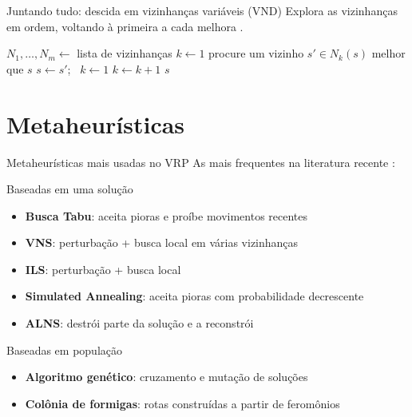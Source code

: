 \documentclass[aspectratio=169,xcolor=table]{beamer}
\begin{document}
\begin{frame}{Juntando tudo: descida em vizinhanças variáveis (VND)}
  Explora as vizinhanças em ordem, voltando à primeira a cada melhora \cite{mladenovic1997variable}.
  \vspace{0.5em}
  \begin{algorithmic}[1]
    \State $N_1, \dots, N_m \gets$ lista de vizinhanças
    \State $k \gets 1$
      \State procure um vizinho $s' \in N_k(s)$ melhor que $s$
        \State $s \gets s'$; \ $k \gets 1$
      \Else
        \State $k \gets k + 1$
      \EndIf
    \EndWhile
    \State \Return $s$ 
  \end{algorithmic}
\end{frame}

\section{Metaheurísticas}

\begin{frame}{Metaheurísticas mais usadas no VRP}
  As mais frequentes na literatura recente \cite{elshaer2020taxonomic,endler2023systematic}:
  \small
  \begin{block}{Baseadas em uma solução}
    \begin{itemize}
      \item \textbf{Busca Tabu}: aceita pioras e proíbe movimentos recentes \cite{glover1986future}
      \item \textbf{VNS}: perturbação + busca local em várias vizinhanças \cite{mladenovic1997variable}
      \item \textbf{ILS}: perturbação + busca local \cite{lourenco2003iterated}
      \item \textbf{Simulated Annealing}: aceita pioras com probabilidade decrescente \cite{kirkpatrick1983optimization}
      \item \textbf{ALNS}: destrói parte da solução e a reconstrói \cite{ropke2006alns}
    \end{itemize}
  \end{block}
  \begin{block}{Baseadas em população}
    \begin{itemize}
      \item \textbf{Algoritmo genético}: cruzamento e mutação de soluções \cite{holland1975adaptation}
      \item \textbf{Colônia de formigas}: rotas construídas a partir de feromônios \cite{dorigo1996ant}
    \end{itemize}
  \end{block}
\end{frame}
\end{document}
